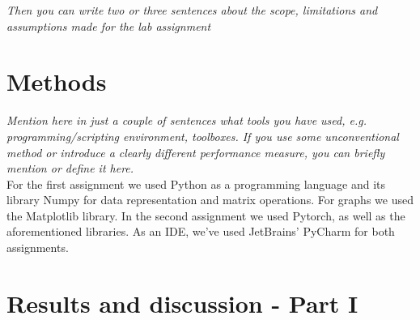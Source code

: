 \documentclass[a4paper]{article}
\begin{document}
\textit{Then you can write two or three sentences about the scope, limitations and assumptions made for the lab assignment}\\

\section{Methods}

\textit{Mention here in just a couple of sentences what tools you have used, e.g. programming/scripting environment, toolboxes. If you use some unconventional method or introduce a clearly different performance measure, you can briefly mention or define it here.}\\

For the first assignment we used Python as a programming language and its library Numpy for data representation and matrix operations. For graphs we used the Matplotlib library. In the second assignment we used Pytorch, as well as the aforementioned libraries. As an IDE, we've used JetBrains' PyCharm for both assignments.

\section{Results and discussion - Part I}
\end{document}
